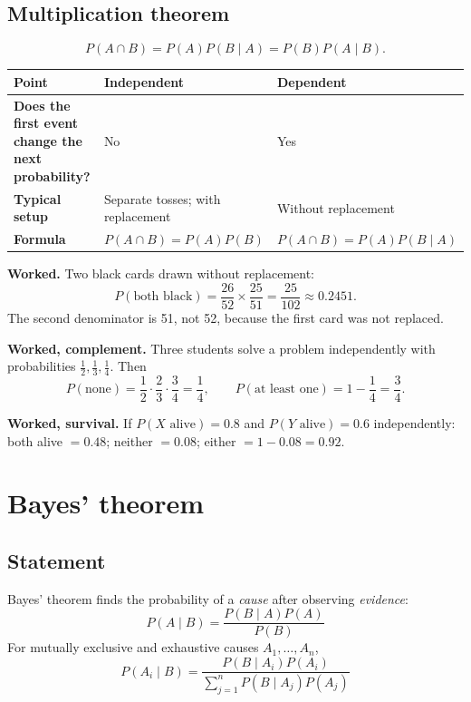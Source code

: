 \documentclass[11pt,a4paper]{article}
\begin{document}
\subsection{Multiplication theorem}
\[
P(A\cap B)=P(A)P(B\mid A)=P(B)P(A\mid B).
\]

\begin{center}\small
\begin{tabularx}{\textwidth}{>{\bfseries}p{} X X}
\toprule Point & Independent & Dependent\\\midrule
Does the first event change the next probability? & No & Yes\\
Typical setup & Separate tosses; with replacement & Without replacement\\
Formula & $P(A\cap B)=P(A)P(B)$ & $P(A\cap B)=P(A)P(B\mid A)$\\
\end{tabularx}
\end{center}

\begin{exambox}
\textbf{Worked.} Two black cards drawn without replacement:
\[
P(\text{both black})=\frac{26}{52}\times\frac{25}{51}=\frac{25}{102}\approx0.2451.
\]
The second denominator is 51, not 52, because the first card was not replaced.

\textbf{Worked, complement.} Three students solve a problem independently with probabilities $\frac12,\frac13,\frac14$. Then
\[
P(\text{none})=\frac12\cdot\frac23\cdot\frac34=\frac14,\qquad
P(\text{at least one})=1-\frac14=\frac34.
\]

\textbf{Worked, survival.} If $P(X\text{ alive})=0.8$ and $P(Y\text{ alive})=0.6$ independently: both alive $=0.48$; neither $=0.08$; either $=1-0.08=0.92$.
\end{exambox}

\section{Bayes' theorem}

\subsection{Statement}
Bayes' theorem finds the probability of a \emph{cause} after observing \emph{evidence}:
\[
\boxed{P(A\mid B)=\frac{P(B\mid A)P(A)}{P(B)}}
\]
For mutually exclusive and exhaustive causes $A_1,\dots,A_n$,
\[
\boxed{P(A_i\mid B)=\frac{P(B\mid A_i)P(A_i)}{\displaystyle\sum_{j=1}^{n}P(B\mid A_j)P(A_j)}}
\]
\end{document}
